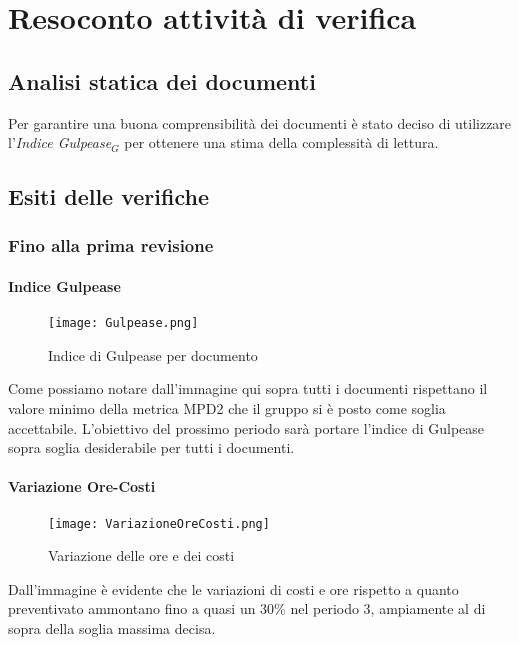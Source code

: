 \chapter{Resoconto attività di verifica}
\section{Analisi statica dei documenti}
Per garantire una buona comprensibilità dei documenti è stato deciso di utilizzare l'\textit{Indice Gulpease}$_G$ per ottenere una stima della complessità di lettura.
\section{Esiti delle verifiche}
    \subsection{Fino alla prima revisione}
      \subsubsection{Indice Gulpease}  
        \begin{figure}[h!]
            \centering
            \texttt{[image: Gulpease.png]}
            \caption{Indice di Gulpease per documento}
        \end{figure}
        Come possiamo notare dall'immagine qui sopra tutti i documenti rispettano il valore minimo della metrica MPD2 che il gruppo si è posto come soglia accettabile. L'obiettivo del prossimo periodo sarà portare l'indice di Gulpease sopra soglia desiderabile per tutti i documenti. 
      \subsubsection{Variazione Ore-Costi}  
        \begin{figure}[h!]
            \centering
            \texttt{[image: VariazioneOreCosti.png]}
            \caption{Variazione delle ore e dei costi}
        \end{figure}
        Dall'immagine è evidente che le variazioni di costi e ore rispetto a quanto preventivato ammontano fino a quasi un 30\% nel periodo 3, ampiamente al di sopra della soglia massima decisa.
